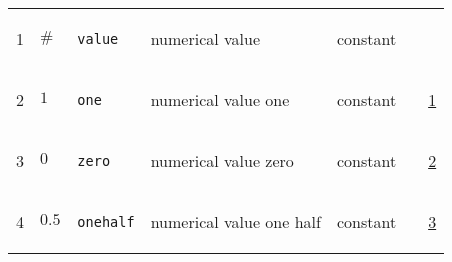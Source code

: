 \begin{longtable}{|p{1cm}|p{2.5cm}|p{4.5cm}|p{8cm}|p{3.0cm}|p{3cm}|p{1cm}|}
                 \\
            1
             & \hypertarget{"v:1"}{ $ {\#}{_{}} $}
             & \verb|value|
             & numerical value
             & \begin{lay}constant \end{lay}
             & $  $
             & \\
            2
             & \hypertarget{"v:2"}{ $ {1}{_{}} $}
             & \verb|one|
             & numerical value one
             & \begin{lay}constant \end{lay}
             & $  $
             &                 \hyperlink{"e:1"}{ 1 }
                 \\
            3
             & \hypertarget{"v:3"}{ $ {0}{_{}} $}
             & \verb|zero|
             & numerical value zero
             & \begin{lay}constant \end{lay}
             & $  $
             &                 \hyperlink{"e:2"}{ 2 }
                 \\
            4
             & \hypertarget{"v:4"}{ $ {0.5}{_{}} $}
             & \verb|onehalf|
             & numerical value one half
             & \begin{lay}constant \end{lay}
             & $  $
             &                 \hyperlink{"e:3"}{ 3 }
                 \\
    \end{longtable}
